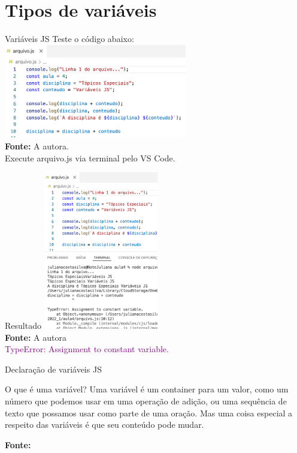 \documentclass{beamer}
\begin{document}
\section{Tipos de variáveis}
\begin{frame}{Variáveis JS}
Teste o código abaixo:
    \centering
	\includegraphics[width=80mm]{aulas/resources/aula_js_4_3.png}\\
    \tiny{ \textbf{Fonte:} A autora.}\\
    Execute arquivo.js via terminal pelo VS Code.
\end{frame}
    \begin{frame}{Resultado}
    \centering
	\includegraphics[width=50mm]{aulas/resources/aula_js_4_4.png}\\
            \tiny{\textbf{Fonte:} A autora}\\
            \textcolor{purple}{TypeError: Assignment to constant variable.}
    \end{frame}
    \begin{frame}{Declaração de variáveis JS}
    \begin{block}{O que é uma variável?}
    Uma variável é um container para um valor, como um número que podemos usar em uma operação de adição, ou uma sequência de texto que possamos usar como parte de uma oração. Mas uma coisa especial a respeito das variáveis é que seu conteúdo pode mudar.
    \end{block}
    \centering
    \vspace{0.5cm}
    \tiny{\textbf{Fonte:} \cite{moziladev2022js}}
    \end{frame}
    
\end{document}
